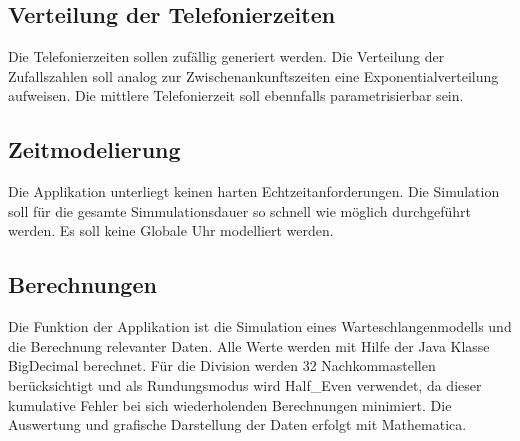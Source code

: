 \subsection{Verteilung der Telefonierzeiten}
Die Telefonierzeiten sollen zufällig generiert werden. Die Verteilung der Zufallszahlen soll analog zur Zwischenankunftszeiten eine Exponentialverteilung aufweisen. Die mittlere Telefonierzeit soll ebennfalls parametrisierbar sein.

\subsection{Zeitmodelierung}
Die Applikation unterliegt keinen harten Echtzeitanforderungen. Die Simulation soll für die gesamte Simmulationsdauer so schnell wie möglich durchgeführt werden. Es soll keine Globale Uhr modelliert werden.

\subsection{Berechnungen}
Die Funktion der Applikation ist die Simulation eines Warteschlangenmodells und die Berechnung relevanter Daten. Alle Werte werden mit Hilfe der Java Klasse BigDecimal berechnet. Für die Division werden 32 Nachkommastellen berücksichtigt und als Rundungsmodus wird Half\_Even verwendet, da dieser kumulative Fehler bei sich wiederholenden Berechnungen minimiert.
Die Auswertung und grafische Darstellung der Daten erfolgt mit Mathematica.

